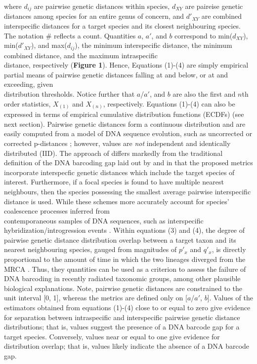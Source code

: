 \documentclass[12pt]{article}
\begin{document}
\noindent where $d_{ij}$ are pairwise genetic distances within species, $d_{XY}$ are paireise genetic distances among species for an entire genus of concern, and $d'_{XY}$ are combined interspecific distances for a target species and its closest neighbouring species. The notation \# reflects a count.  Quantities $a$, $a'$, and $b$ correspond to min($d_{XY}$), min($d'_{XY}$), and max($d_{ij}$), the minimum interspecific distance, the minimum combined distance, and the maximum intraspecific \\ distance, respectively (\textbf{Figure 1}). Hence, Equations (1)-(4) are simply empirical partial means of pairwise genetic distances falling at and below, or at and exceeding, given \\ distribution thresholds. Notice further that $a$/$a'$, and $b$ are also the first and $n$th order statistics, $X_{(1)}$ and $X_{(n)}$, respectively. Equations (1)-(4) can also be expressed in terms of empirical cumulative distribution functions (ECDFs) (see next section). Pairwise genetic distances form a continuous distribution and are easily computed from a model of DNA sequence evolution, such as uncorrected or corrected p-distances \citep{jukes1969evolution, kimura1980simple}; however, values are \textit{not} independent and identically distributed (IID). The approach of \citet{phillips2024measure} differs markedly from the traditional definition of the DNA barcoding gap laid out by \citet{meyer2005dna} and \citet{meier2008use} in that the proposed metrics incorporate interspecfic genetic distances which include the target species of interest. Furthermore, if a focal species is found to have multiple nearest neighbours, then the species possessing the smallest average pairwise interspecific distance is used. While these schemes more accurately account for species' coalescence processes inferred from \\ contemporaneous samples of DNA sequences, such as interspecific \\ hybridization/introgression events \citep{phillips2024measure}. Within equations (3) and (4), the degree of pairwise genetic distance distribution overlap between a target taxon and its nearest neighbouring species, gauged from magnitudes of $p'_x$ and $q'_x$, is directly proportional to the amount of time in which the two lineages diverged from the MRCA \citep{phillips2024measure}. Thus, they quantities can be used as a criterion to assess the failure of DNA barcoding in recently radiated taxonomic groups, among other plausible biological explanations.  Note, pairwise genetic distances are constrained to the unit interval [0, 1], whereas the metrics are defined only on [$a$/$a'$, $b$]. Values of the estimators obtained from equations (1)-(4) close to or equal to zero give evidence for separation between intraspecific and interspecific pairwise genetic distance distributions; that is, values suggest the presence of a DNA barcode gap for a target species. Conversely, values near or equal to one give evidence for distribution overlap; that is, values likely indicate the absence of a DNA barcode gap. 
\end{document}
